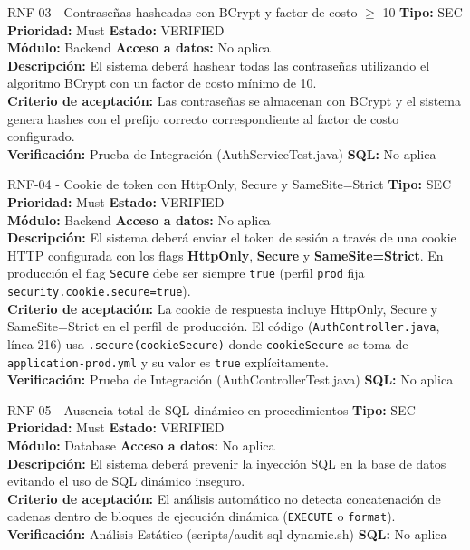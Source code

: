 \documentclass[11pt,a4paper]{article}
\begin{document}
\begin{requisito}{RNF-03 - Contraseñas hasheadas con BCrypt y factor de costo $\ge$ 10}
    \textbf{Tipo:} SEC \quad \textbf{Prioridad:} Must \quad \textbf{Estado:} VERIFIED \\[0.2cm]
    \textbf{Módulo:} Backend \quad \textbf{Acceso a datos:} No aplica \\[0.2cm]
    \textbf{Descripción:} El sistema deberá hashear todas las contraseñas utilizando el algoritmo BCrypt con un factor de costo mínimo de 10. \\[0.2cm]
    \textbf{Criterio de aceptación:} Las contraseñas se almacenan con BCrypt y el sistema genera hashes con el prefijo correcto correspondiente al factor de costo configurado. \\[0.2cm]
    \textbf{Verificación:} Prueba de Integración (AuthServiceTest.java) \quad \textbf{SQL:} No aplica
\end{requisito}

\begin{requisito}{RNF-04 - Cookie de token con HttpOnly, Secure y SameSite=Strict}
    \textbf{Tipo:} SEC \quad \textbf{Prioridad:} Must \quad \textbf{Estado:} VERIFIED \\[0.2cm]
    \textbf{Módulo:} Backend \quad \textbf{Acceso a datos:} No aplica \\[0.2cm]
    \textbf{Descripción:} El sistema deberá enviar el token de sesión a través de una cookie HTTP configurada con los flags \textbf{HttpOnly}, \textbf{Secure} y \textbf{SameSite=Strict}. En producción el flag \texttt{Secure} debe ser siempre \texttt{true} (perfil \texttt{prod} fija \texttt{security.cookie.secure=true}). \\[0.2cm]
    \textbf{Criterio de aceptación:} La cookie de respuesta incluye HttpOnly, Secure y SameSite=Strict en el perfil de producción. El código (\texttt{AuthController.java}, línea 216) usa \texttt{.secure(cookieSecure)} donde \texttt{cookieSecure} se toma de \texttt{application-prod.yml} y su valor es \texttt{true} explícitamente. \\[0.2cm]
    \textbf{Verificación:} Prueba de Integración (AuthControllerTest.java) \quad \textbf{SQL:} No aplica
\end{requisito}

\begin{requisito}{RNF-05 - Ausencia total de SQL dinámico en procedimientos}
    \textbf{Tipo:} SEC \quad \textbf{Prioridad:} Must \quad \textbf{Estado:} VERIFIED \\[0.2cm]
    \textbf{Módulo:} Database \quad \textbf{Acceso a datos:} No aplica \\[0.2cm]
    \textbf{Descripción:} El sistema deberá prevenir la inyección SQL en la base de datos evitando el uso de SQL dinámico inseguro. \\[0.2cm]
    \textbf{Criterio de aceptación:} El análisis automático no detecta concatenación de cadenas dentro de bloques de ejecución dinámica (\texttt{EXECUTE} o \texttt{format}). \\[0.2cm]
    \textbf{Verificación:} Análisis Estático (scripts/audit-sql-dynamic.sh) \quad \textbf{SQL:} No aplica
\end{requisito}
\end{document}
